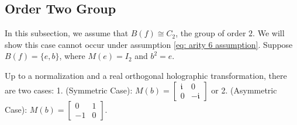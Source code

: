 \subsection{Order Two Group}\label{subsec: Order Two group}
In this subsection, we assume that $B(f)\cong C_2$, the group of order $2$. 
We will show this case cannot occur under assumption \eqref{eq: arity 6 assumption}.
Suppose $B(f)=\{e,b\}$, where $M(e)=I_2$ and $b^2=e.$
\begin{lemma}\label{lm: C2 standard form}
    Up to a normalization and a real orthogonal holographic transformation, there are two cases: 1. (Symmetric Case): $M(b)=\left[\begin{matrix}
        \mathfrak{i} & 0\\
        0 & -\mathfrak{i}
    \end{matrix}\right]$
    or 2. (Asymmetric Case):
    $M(b)=\left[\begin{matrix}
        0 & 1\\
        -1 & 0
    \end{matrix}\right].$
\end{lemma}
